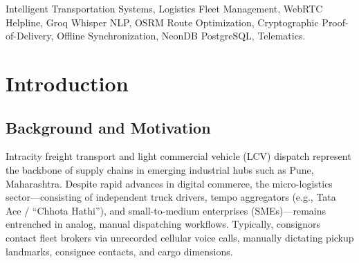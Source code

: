 \documentclass[conference]{IEEEtran}
\begin{document}
\begin{abstract}
The local intracity goods transport and commercial tempo sector remains heavily dependent on fragmented telephone calls and manual dispatch mechanisms. This legacy paradigm imposes severe operational bottlenecks: high data entry overhead, error-prone address transcription, prolonged customer wait times (8--12 minutes per manual booking), and poor fleet utilization. While consumer ride-sharing platforms have succeeded in personal mobility, they enforce mandatory smartphone application downloads, penalizing non-digitally literate demographics and traditional B2B logistics operators. This paper presents \textbf{EMINENCE}, a dual-channel, open-source smart transport booking and fleet telematics platform designed to bridge the digital divide. EMINENCE combines an automated peer-to-peer WebRTC/PeerJS voice helpline and a Groq Whisper-powered natural language processing (NLP) voice booking engine with a high-performance React and React Native monorepo web-mobile interface. The system integrates automated caller recognition, Open Source Routing Machine (OSRM) multi-stop traveling salesperson problem (TSP) route optimization, dynamic surge pricing, an ACID-compliant PostgreSQL database on NeonDB, and a tamper-evident SHA-256 cryptographic Proof-of-Delivery (PoD) mechanism. Furthermore, an offline-first SQLite synchronization engine guarantees operational resilience for drivers navigating cellular dead zones. Rigorous empirical validation over 56 automated test suites demonstrates that EMINENCE reduces booking latency from 8--12 minutes to under 30 seconds, decreases dispatch operating costs by 90\% compared to proprietary telephony services (e.g., Twilio), and achieves a 99.5\% transaction completion rate under high-concurrency workloads.
\end{abstract}

\begin{IEEEkeywords}
Intelligent Transportation Systems, Logistics Fleet Management, WebRTC Helpline, Groq Whisper NLP, OSRM Route Optimization, Cryptographic Proof-of-Delivery, Offline Synchronization, NeonDB PostgreSQL, Telematics.
\end{IEEEkeywords}

\section{Introduction}
\subsection{Background and Motivation}
Intracity freight transport and light commercial vehicle (LCV) dispatch represent the backbone of supply chains in emerging industrial hubs such as Pune, Maharashtra. Despite rapid advances in digital commerce, the micro-logistics sector—consisting of independent truck drivers, tempo aggregators (e.g., Tata Ace / ``Chhota Hathi''), and small-to-medium enterprises (SMEs)—remains entrenched in analog, manual dispatching workflows. Typically, consignors contact fleet brokers via unrecorded cellular voice calls, manually dictating pickup landmarks, consignee contacts, and cargo dimensions.
\end{document}
